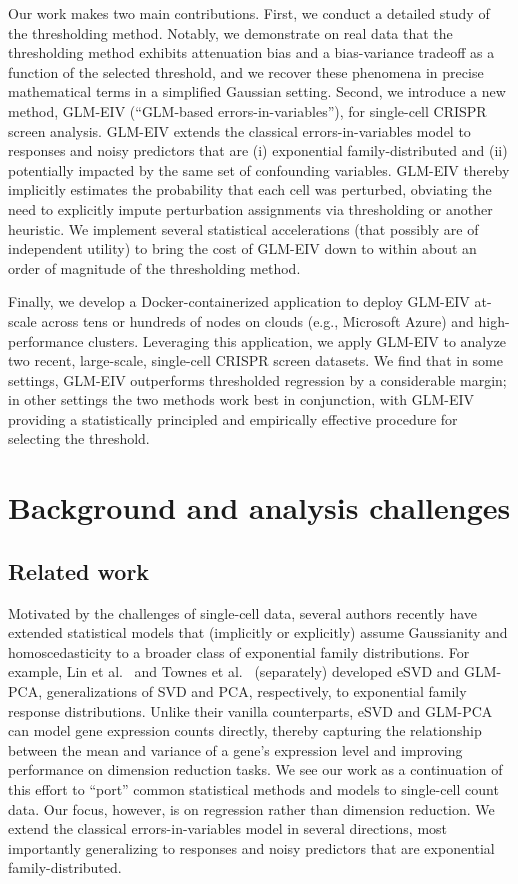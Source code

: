 \documentclass[12pt]{article}
\begin{document}
Our work makes two main contributions. First, we conduct a detailed study of the thresholding method. Notably, we demonstrate on real data that the thresholding method exhibits attenuation bias and a bias-variance tradeoff as a function of the selected threshold, and we recover these phenomena in precise mathematical terms in a simplified Gaussian setting. Second, we introduce a new method, GLM-EIV (``GLM-based errors-in-variables''), for single-cell CRISPR screen analysis. GLM-EIV extends the classical errors-in-variables model to responses and noisy predictors that are (i) exponential family-distributed and (ii) potentially impacted by the same set of confounding variables. GLM-EIV thereby implicitly estimates the probability that each cell was perturbed, obviating the need to explicitly impute perturbation assignments via thresholding or another heuristic. We implement several statistical accelerations (that possibly are of independent utility) to bring the cost of GLM-EIV down to within about an order of magnitude of the thresholding method.

Finally, we develop a Docker-containerized application to deploy GLM-EIV at-scale across tens or hundreds of nodes on clouds (e.g., Microsoft Azure) and high-performance clusters. Leveraging this application, we apply GLM-EIV to analyze two recent, large-scale, single-cell CRISPR screen datasets. We find that in some settings, GLM-EIV outperforms thresholded regression by a considerable margin; in other settings the two methods work best in conjunction, with GLM-EIV providing a statistically principled and empirically effective procedure for selecting the threshold.

\section{Background and analysis challenges}

\subsection{Related work}
Motivated by the challenges of single-cell data, several authors recently have extended statistical models that (implicitly or explicitly) assume Gaussianity and homoscedasticity to a broader class of exponential family distributions. For example, Lin et al.\ \parencite{Lin2021} and Townes et al.\ \parencite{Townes2019}  (separately) developed eSVD and GLM-PCA, generalizations of SVD and PCA, respectively, to exponential family response distributions. Unlike their vanilla counterparts, eSVD and GLM-PCA can model gene expression counts directly, thereby capturing the relationship between the mean and variance of a gene's expression level \parencite{Lause2021} and improving performance on dimension reduction tasks. We see our work as a continuation of this effort to ``port'' common statistical methods and models to single-cell count data. Our focus, however, is on regression rather than dimension reduction. We extend the classical errors-in-variables model in several directions, most importantly generalizing to responses and noisy predictors that are exponential family-distributed.
\end{document}
